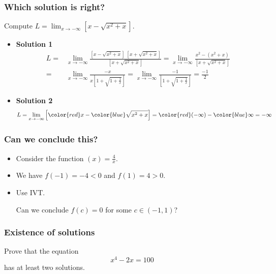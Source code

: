 \begin{frame}
	\fontsize{13}{13}\selectfont
	\frametitle{Which solution is right?}
	Compute
	$\displaystyle L = \lim_{x \to -\infty}\left[ x - \sqrt{x^{2}+x}\right]$.

	\begin{itemize}
		\item {\bfseries Solution 1} {\fontsize{11}{11}\selectfont \begin{align*}L =&\lim_{x\to -\infty}\frac{\left[ x - \sqrt{x^{2}+x} \right] \; \left[ x + \sqrt{x^{2}+x} \right]}{\left[ x + \sqrt{x^{2}+x} \right]}= \lim_{x \to -\infty}\frac{x^{2}-(x^{2}+x)}{\left[ x + \sqrt{x^{2}+x} \right]}\\ =&\lim_{x \to -\infty}\frac{-x}{x \left[ 1 + \sqrt{1 + \frac{1}{x}} \right]}= \lim_{x \to -\infty}\frac{-1}{ \left[ 1 + \sqrt{1 + \frac{1}{x}} \right]}= \frac{-1}{2}\end{align*} }

		\item {\bfseries Solution 2}
			\[
				L = \lim_{x \to -\infty}\left[{\color{red} x }-{\color{blue} \sqrt{x^{2}+x} }
				\right] ={\color{red}(-\infty)}-{\color{blue}\infty}= - \infty
			\]
	\end{itemize}
\end{frame}

\begin{frame}
	\frametitle{Can we conclude this?}

	\begin{itemize}
		\item Consider the function $\displaystyle (x)=\frac{4}{x}$.
			\vfill

		\item We have \quad $f(-1)=-4<0$ \quad and \quad $f(1)=4>0$.
			\vfill

		\item Use IVT.

			Can we conclude $f(c)=0$ for some $c\in(-1,1)$?
	\end{itemize}
	\vfill
	\vfill
\end{frame}

\begin{frame}
	\frametitle{Existence of solutions}

	Prove that the equation
	\[
		x^{4}- 2x = 100
	\]
	has at least two solutions.
\end{frame}

